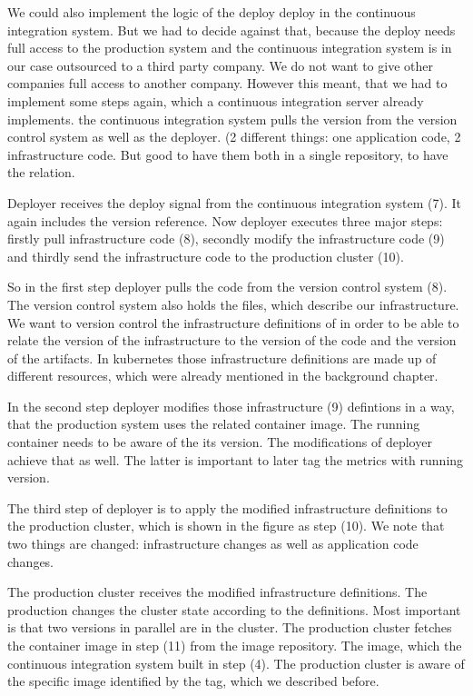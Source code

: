 We could also implement the logic of the deploy deploy in the continuous integration
system. But we had to decide against that, because the deploy needs full access to the
production system and the continuous integration system is in our case outsourced to a
third party company. We do not want to give other companies full access to another
company. However this meant, that we had to implement some steps again, which a continuous
integration server already implements.  the continuous integration system pulls the
version from the version control system as well as the deployer. (2 different things: one
application code, 2 infrastructure code. But good to have them both in a single
repository, to have the relation.

Deployer receives the deploy signal from the continuous integration system (7). It again
includes the version reference. Now deployer executes three major steps: firstly pull
infrastructure code (8), secondly modify the infrastructure code (9) and thirdly send the
infrastructure code to the production cluster (10).

So in the first step deployer pulls the code from the version control system (8). The
version control system also holds the files, which describe our infrastructure. We want to
version control the infrastructure definitions of in order to be able to relate the
version of the infrastructure to the version of the code and the version of the
artifacts. In kubernetes those infrastructure definitions are made up of different
resources, which were already mentioned in the background chapter.

In the second step deployer modifies those infrastructure (9) defintions in a way, that
the production system uses the related container image. The running container needs to be
aware of the its version. The modifications of deployer achieve that as well. The latter
is important to later tag the metrics with running version.

The third step of deployer is to apply the modified infrastructure definitions to the
production cluster, which is shown in the figure as step (10). We note that two things are
changed: infrastructure changes as well as application code changes.

The production cluster receives the modified infrastructure definitions. The production
changes the cluster state according to the definitions. Most important is that two
versions in parallel are in the cluster. The production cluster fetches the container
image in step (11) from the image repository. The image, which the continuous integration
system built in step (4). The production cluster is aware of the specific image identified
by the tag, which we described before.

